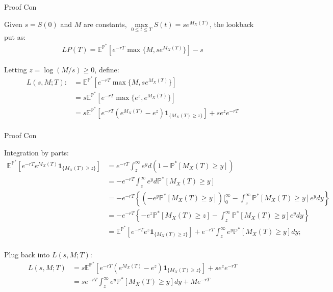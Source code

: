 \documentclass{beamer}
\begin{document}
\begin{frame}{Proof Con}

    {\footnotesize \footnotesize
    \par Given $s = S(0)$ and $M$ are constants, \(\max\limits_{0 \leq t \leq T} S(t) = s  e^{M_X(T)}\), the lookback put as:
    \vspace{1em}
    \begin{align*}
      LP(T) = \mathbb{E}^{\mathbb{P}^*} \left[ e^{-rT} \max\{M, se^{M_X(T)}\} \right] - s
    \end{align*}
     \vspace{1em}
    \par  Letting \(z=\log(M/s)\geq 0\), define:
     \vspace{1em}
    \begin{align*}
      L(s, M; T)  :&= \mathbb{E}^{\mathbb{P}^*} \left[ e^{-rT} \max\{M, se^{M_X(T)}\} \right] \\
      &= s  \mathbb{E}^{\mathbb{P}^*} \left[ e^{-rT} \max\{e^z, e^{M_X(T)}\} \right]\\
      &  = s  \mathbb{E}^{\mathbb{P}^*} \left[ e^{-rT} \left( e^{M_X(T)} - e^z \right) \mathbf{1}_{\{M_X(T) \geq z\}} \right] + s  e^z  e^{-rT}\\
    \end{align*}
    }
    
\end{frame}
\begin{frame}{Proof Con}

    {\footnotesize \footnotesize
    \par Integration by parts:
    {\footnotesize \tiny
    \begin{align*}
      \mathbb{E}^{\mathbb{P}^*} \left[ e^{-rT} e^{M_X(T)} \mathbf{1}_{\{M_X(T) \geq z\}} \right] 
      & = e^{-rT} \int_{z}^{\infty} e^y  d(1-\mathbb{P}^* [M_X(T) \geq y])\\
      & = -e^{-rT} \int_{z}^{\infty} e^y  d\mathbb{P}^* [M_X(T) \geq y]\\
      & = -e^{-rT} \left\{ \left(-e^y \mathbb{P}^* [M_X(T) \geq y]\right)\bigg|_0^{\infty} - 
      \int_{z}^{\infty} \mathbb{P}^* [M_X(T) \geq y] e^y  dy \right\}\\
      &= -e^{-rT} \left\{ -e^z \mathbb{P}^* [M_X(T) \geq z] - \int_{z}^{\infty} \mathbb{P}^* [M_X(T) \geq y] e^y  dy \right\}\\
      &= \mathbb{E}^{\mathbb{P}^*} \left[ e^{-rT} e^z \mathbf{1}_{\{M_X(T) \geq z\}} \right] + e^{-rT} \int_{z}^{\infty} e^y \mathbb{P}^* [M_X(T) \geq y]  dy;\\
    \end{align*}
    }
    \par Plug back into $ L(s, M; T)$:
    {\footnotesize \tiny
    \begin{align*}
       L(s, M; T) & = s  \mathbb{E}^{\mathbb{P}^*} \left[ e^{-rT} \left( e^{M_X(T)} - e^z \right) \mathbf{1}_{\{M_X(T) \geq z\}} \right] + s  e^z  e^{-rT}\\
       & =  se^{-rT} \int_{z}^{\infty} e^{y} \mathbb{P}^*[M_X(T) \geq y] dy + Me^{-rT} \\
    \end{align*}
    }
    }
    
\end{frame}
\end{document}
